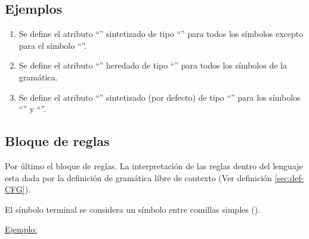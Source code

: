 \subsection*{Ejemplos}
\begin{enumerate}

\item 
\vspace{0.2cm}
Se define el atributo ``'' sintetizado de tipo ``'' para todos los símbolos excepto para el símbolo ``''.

\item
\vspace{0.2cm}
Se define el atributo ``'' heredado de tipo ``'' para todos los símbolos de la gramática.

\item 
\vspace{0.2cm}
Se define el atributo ``'' sintetizado (por defecto) de tipo ``'' para los símbolos ``'' y ``''.\\
\end{enumerate}

\subsection{Bloque de reglas}
Por último el bloque de reglas. La interpretación de las reglas dentro del lenguaje esta dada por la definición de gramática libre de contexto (Ver definición \ref{sec:def-CFG}).          

El símbolo terminal se considera un símbolo entre comillas simples ().

\underline{Ejemplo:}
\vspace{0.2cm}
\begin{center}
\\
\end{center}
\vspace{0.2cm}

